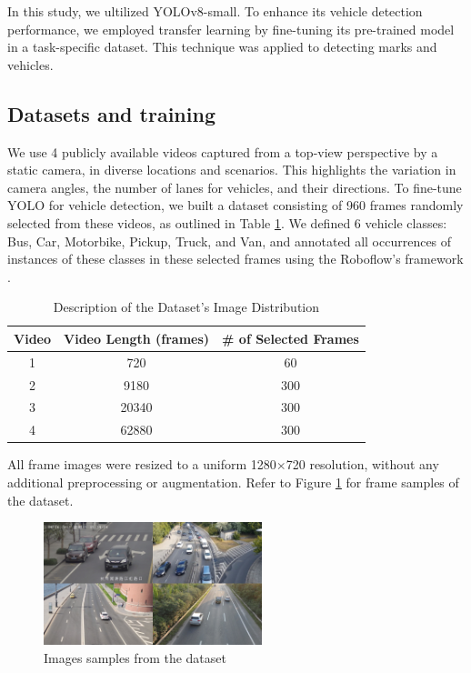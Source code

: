 \documentclass[10pt,conference]{IEEEtran}
\begin{document}
In this study, we ultilized YOLOv8-small. To enhance its vehicle detection performance, we employed transfer learning by fine-tuning its pre-trained model in a task-specific dataset. This technique was applied to detecting marks and vehicles.

\subsection{Datasets and training}

We use 4 publicly available videos captured from a top-view perspective by a static camera, in diverse locations and scenarios. This highlights the variation in camera angles, the number of lanes for vehicles, and their directions.
To fine-tune YOLO for vehicle detection, we built a dataset consisting of 960 frames randomly selected from these videos, as outlined in Table \ref{tab:dataset}.
We defined 6 vehicle classes: Bus, Car, Motorbike, Pickup, Truck, and Van, and annotated all occurrences of instances of these classes in these selected frames %
using the Roboflow's framework \cite{roboflow}.

\begin{table}[htp]
\renewcommand{\arraystretch}{1.3}
    \caption{Description of the Dataset's Image Distribution}
    \label{tab:dataset}
    \centering
    \begin{tabular}{|c||c||c|}
        \hline
        Video & Video Length (frames) & \# of Selected Frames\\
        \hline
        1 & 720 & 60\\ %
        \hline
        2 & 9180 & 300\\ %
        \hline
        3 & 20340 & 300\\ %
        \hline
        4 & 62880 & 300\\ %
    \hline
    \end{tabular}
\end{table}



All frame images were resized to a uniform 1280$\times$720 resolution, without any additional preprocessing or augmentation. Refer to Figure \ref{fig:dataset} for frame samples of the dataset.

\begin{figure}[htp]
    \centering
    \includegraphics[width=2.5in]{figs/data-merge.jpg}
    \caption{Images samples from the dataset}
    \label{fig:dataset}
\end{figure}
\end{document}

